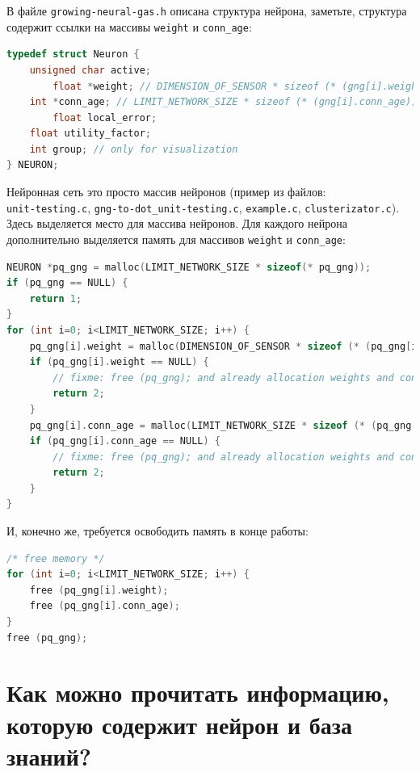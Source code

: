 \documentclass[unicode, 12pt, a4paper,oneside,fleqn]{article}
\begin{document}
В файле \verb'growing-neural-gas.h' описана структура нейрона,
заметьте, структура содержит ссылки на массивы \verb'weight' и
\verb'conn_age':

\begin{lstlisting}[language=C,
  caption={Описание структуры нейрона},
  captionpos=b,
  label={nueron:code}]
typedef struct Neuron {
	unsigned char active;
        float *weight; // DIMENSION_OF_SENSOR * sizeof (* (gng[i].weight))
	int *conn_age; // LIMIT_NETWORK_SIZE * sizeof (* (gng[i].conn_age))
        float local_error;
	float utility_factor;
	int group; // only for visualization
} NEURON;
\end{lstlisting}


Нейронная сеть это просто массив нейронов (пример из файлов:\\
\verb'unit-testing.c', \verb'gng-to-dot_unit-testing.c',
\verb'example.c', \verb'clusterizator.c').  Здесь выделяется место
для массива нейронов.  Для каждого нейрона дополнительно выделяется
память для массивов \verb'weight' и \verb'conn_age':

\begin{lstlisting}[language=C,
  caption={Выделение памяти},
  captionpos=b,
  label={malloc:code},
  linewidth=14cm]
NEURON *pq_gng = malloc(LIMIT_NETWORK_SIZE * sizeof(* pq_gng));
if (pq_gng == NULL) {
	return 1;
}
for (int i=0; i<LIMIT_NETWORK_SIZE; i++) {
	pq_gng[i].weight = malloc(DIMENSION_OF_SENSOR * sizeof (* (pq_gng[i].weight)));
	if (pq_gng[i].weight == NULL) {
		// fixme: free (pq_gng); and already allocation weights and conn_ages
		return 2;
	}
	pq_gng[i].conn_age = malloc(LIMIT_NETWORK_SIZE * sizeof (* (pq_gng[i].conn_age)));
	if (pq_gng[i].conn_age == NULL) {
		// fixme: free (pq_gng); and already allocation weights and conn_ages
		return 2;
	}
}
\end{lstlisting}

И, конечно же, требуется освободить память в конце работы:
\begin{lstlisting}[language=C,
  caption={Освобождение памяти},
  captionpos=b,
  label={free:code}]
/* free memory */
for (int i=0; i<LIMIT_NETWORK_SIZE; i++) {
	free (pq_gng[i].weight);
	free (pq_gng[i].conn_age);
}
free (pq_gng);
\end{lstlisting}



\clearpage
\section{Как можно прочитать информацию, которую содержит нейрон и база знаний?}
\end{document}
